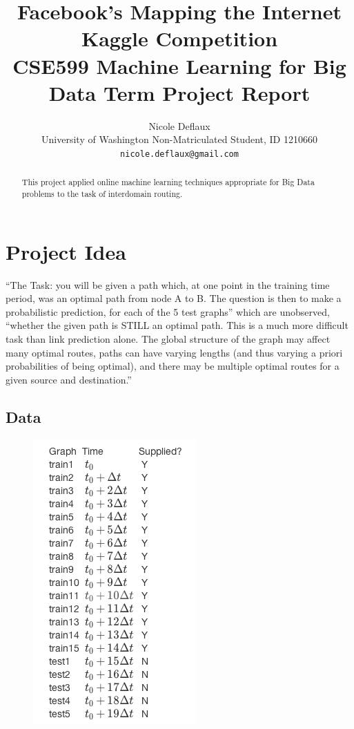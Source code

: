 \documentclass{article} %
\title{Facebook's Mapping the Internet Kaggle Competition \\
{\small CSE599 Machine Learning for Big Data Term Project Report}}
\author{Nicole Deflaux \\
University of Washington Non-Matriculated Student, ID 1210660 \\
\texttt{nicole.deflaux@gmail.com}
}
\begin{document}
\maketitle

\begin{abstract}
  This project applied online machine learning techniques appropriate for
  Big Data problems to the task of interdomain routing.
\end{abstract}


\section{Project Idea}
``The Task: you will be given a path which, at one point in the training time
period, was an optimal path from node A to B. The question is then to make a
probabilistic prediction, for each of the 5 test graphs'' which are
unobserved, ``whether the given path is STILL an optimal path.  This is a
much more difficult task than link prediction alone. The global structure of
the graph may affect many optimal routes, paths can have varying lengths
(and thus varying a priori probabilities of being optimal), and there may be
multiple optimal routes for a given source and destination.''~\cite{kaggle}

\subsection{Data}

\begin{figure}
  \begin{center}
    \includegraphics[scale=.5]{trainAndTestGraphs.png}
  \end{center}
\end{figure}
\end{document}
